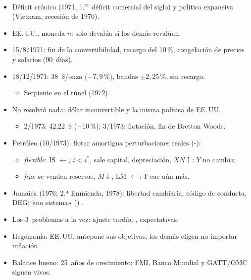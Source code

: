 \documentclass{article}
\begin{document}
\begin{columnas}
\begin{itemize}
\item Déficit crónico (1971, 1.\textsuperscript{er} déficit comercial del siglo) y política expansiva (Vietnam, recesión de 1970).
\item EE.\,UU., moneda $n$: solo devalúa si los demás revalúan.
\item 15/8/1971: fin de la convertibilidad, recargo del 10\,\%, congelación de precios y salarios (90~días).
\end{itemize}
\begin{itemize}
\item 18/12/1971: 38~\$/onza ($-7{,}9$\,\%), bandas $\pm2{,}25$\,\%, sin recargo.
  \begin{itemize}
  \item Serpiente en el túnel (1972) .
  \end{itemize}
\item No resolvió nada: dólar inconvertible y la misma política de EE.\,UU.
  \begin{itemize}
  \item 2/1973: 42,22~\$ ($-10$\,\%); 3/1973: flotación, fin de Bretton Woods.
  \end{itemize}
\item Petróleo (10/1973): flotar amortigua perturbaciones reales (-):
  \begin{itemize}
  \item \emph{flexible}: IS $\leftarrow$, $i<i^*$, sale capital, depreciación, $XN\uparrow$: $Y$ no cambia;
  \item \emph{fijo}: se venden reservas, $M\downarrow$, LM $\leftarrow$: $Y$ cae aún más.
  \end{itemize}
\item Jamaica (1976; 2.ª Enmienda, 1978): libertad cambiaria, código de conducta, DEG; «no sistema» () .
\end{itemize}
\begin{itemize}
\item Los 3~problemas a la vez: ajuste tardío, , expectativas.
\item Hegemonía: EE.\,UU. antepone sus objetivos; los demás eligen no importar inflación.
\item Balance bueno: 25~años de crecimiento; FMI, Banco Mundial y GATT/OMC siguen vivos.
\end{itemize}


\end{columnas}
\end{document}

